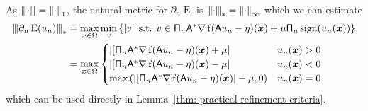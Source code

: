 \documentclass[smallextended]{svjour3}
\newcommand{\norm}[1]{{\left\lVert #1 \right\rVert}}
\newcommand{\Norm}[1]{{\left\vert\kern-0.25ex\left\vert\kern-0.25ex\left\vert #1 \right\vert\kern-0.25ex\right\vert\kern-0.25ex\right\vert}}
\newcommand{\op}[1]{\operatorname{#1}}
\newcommand{\1}{\F{1}}
\DeclareMathOperator{\st}{\;s.t.\;}
\DeclareMathOperator{\sign}{sign}
\newcommand{\data}{\eta}
\newcommand{\Domain}{\Omega}\newcommand{\domain}{\omega}
\newcommand*{\var}[1]{%
	\IfEqCase{#1}{%
		{0}{u}%
		{1}{v}%
		{2}{w}%
	}[u#1]%
}
\begin{document}
	As $\Norm\cdot = \norm\cdot_1$, the natural metric for $\partial_n\op{E}$ is $\Norm\cdot_* = \norm\cdot_\infty$ which we can estimate
	\begin{align}
		\Norm{\partial_n \op{E}(\var0_n)}_* &= \max_{\vec{x}\in\Domain}\min_{\var1}\left\{|\var1| \st \var1\in \tens{\Pi}_n\A^*\nabla\op{f}(\A\var0_n-\data)(\vec{x}) +  \mu\tens{\Pi}_n\sign(\var0_n(\vec{x}))\right\}
		\\&= \max_{\vec{x}\in\Domain}\begin{cases}
			|[\tens{\Pi}_n\A^*\nabla\op{f}(\A\var0_n-\data)(\vec{x}) + \mu| & \var0_n(\vec{x})>0
			\\|[\tens{\Pi}_n\A^*\nabla\op{f}(\A\var0_n-\data)(\vec{x}) - \mu| & \var0_n(\vec{x})<0
			\\\max\left(|[\tens{\Pi}_n\A^*\nabla\op{f}(\A\var0_n-\data)(\vec{x})| - \mu, 0\right) & \var0_n(\vec{x}) = 0
		\end{cases}
	\end{align}
	which can be used directly in Lemma~\ref{thm: practical refinement criteria}.
	
\end{document}
